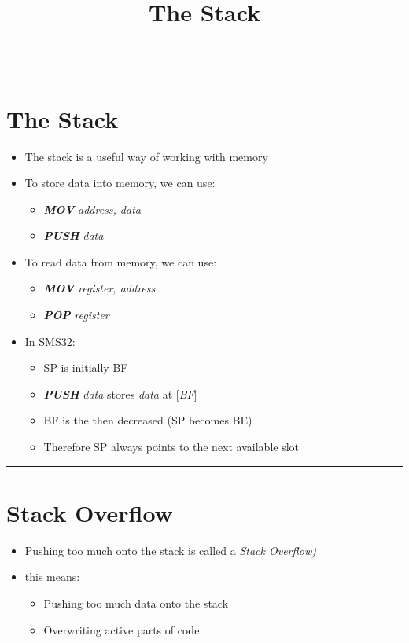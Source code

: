 \documentclass{article}
\title{The Stack}
\begin{document}
\maketitle

\begin{center}
  \rule{.5\textwidth}{0.4pt}
\end{center}

\section{The Stack}
\begin{itemize}
  \item{The stack is a useful way of working with memory}
  \item{To store data into memory, we can use:}
  \begin{itemize}
    \item{\textbf{\textit{MOV}} \textit{address, data}}
    \item{\textbf{\textit{PUSH}} \textit{data}}
  \end{itemize}
  \item{To read data from memory, we can use:}
  \begin{itemize}
    \item{\textbf{\textit{MOV}} \textit{register, address}}
    \item{\textbf{\textit{POP}} \textit{register}}
  \end{itemize}
  \item{In SMS32:}
  \begin{itemize}
    \item{SP is initially BF}
    \item{\textbf{\textit{PUSH}} \textit{data} stores \textit{data} at $[$\textit{BF}$]$}
    \item{BF is the then decreased (SP becomes BE)}
    \item{Therefore SP always points to the next available slot}
  \end{itemize}
\end{itemize}

\begin{center}
  \rule{.5\textwidth}{0.4pt}
\end{center}

\section{Stack Overflow}
\begin{itemize}
  \item{Pushing too much onto the stack is called a \textit{Stack Overflow)}}
  \item{this means:}
  \begin{itemize}
    \item{Pushing too much data onto the stack}
    \item{Overwriting active parts of code}
  \end{itemize}
\end{itemize}
\end{document}
